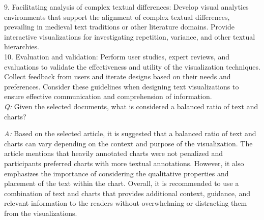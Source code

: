 9. Facilitating analysis of complex textual differences: Develop visual analytics environments that support the alignment of complex textual differences, prevailing in medieval text traditions or other literature domains. Provide interactive visualizations for investigating repetition, variance, and other textual hierarchies. \\
10. Evaluation and validation: Perform user studies, expert reviews, and evaluations to validate the effectiveness and utility of the visualization techniques. Collect feedback from users and iterate designs based on their needs and preferences. Consider these guidelines when designing text visualizations to ensure effective communication and comprehension of information.\\

\textit{Q: } Given the selected documents, what is considered a balanced ratio of text and charts?

\textit{A: }
Based on the selected article, it is suggested that a balanced ratio of text and charts can vary depending on the context and purpose of the visualization. 
The article mentions that heavily annotated charts were not penalized and participants preferred charts with more textual annotations. 
However, it also emphasizes the importance of considering the qualitative properties and placement of the text within the chart. 
Overall, it is recommended to use a combination of text and charts that provides additional context, guidance, and relevant information to the readers without overwhelming or distracting them from the visualizations.



